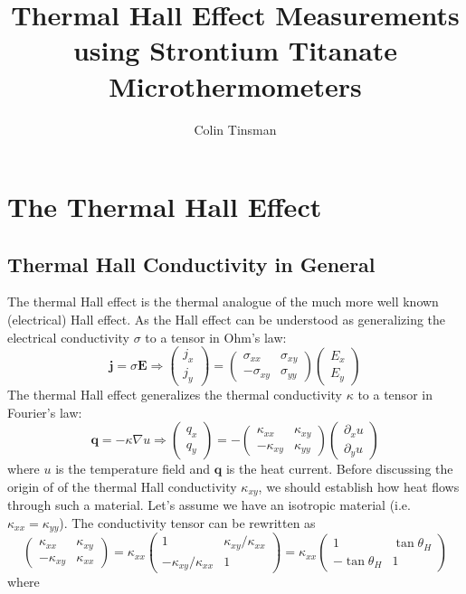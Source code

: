 \documentclass{thesis-umich}
\author{Colin Tinsman}
\title{Thermal Hall Effect Measurements using Strontium Titanate Microthermometers}
\begin{document}
\doublespacing
\chapter{The Thermal Hall Effect}


\section{Thermal Hall Conductivity in General}

The thermal Hall effect is the thermal analogue of the much more well known
(electrical) Hall effect. As the Hall effect can be understood as generalizing
the electrical conductivity \(\sigma\) to a tensor in Ohm's law: \[\mathbf{j} =
	\sigma \mathbf{E} \Rightarrow \begin{pmatrix} j_x \\ j_y \end{pmatrix}
= \begin{pmatrix} \sigma_{xx} & \sigma_{xy} \\ -\sigma_{xy} & \sigma_{yy}
\end{pmatrix} \begin{pmatrix} E_x \\ E_y \end{pmatrix} \] The thermal Hall
effect generalizes the thermal conductivity \(\kappa\) to a tensor in Fourier's
law: \[\mathbf{q} = -\kappa \nabla u \Rightarrow \begin{pmatrix} q_x \\ q_y
	\end{pmatrix} = -\begin{pmatrix} \kappa_{xx} & \kappa_{xy} \\
		-\kappa_{xy} & \kappa_{yy} \end{pmatrix} \begin{pmatrix}
		\partial_x u \\ \partial_y u \end{pmatrix} \] where \(u\) is
	the temperature field and \(\mathbf{q}\) is the heat current. Before
	discussing the origin of of the thermal Hall conductivity
	\(\kappa_{xy}\), we should establish how heat flows through such a
	material. Let's assume we have an isotropic material (i.e.
	\(\kappa_{xx} = \kappa_{yy}\)). The conductivity tensor can be
	rewritten as \[\begin{pmatrix} \kappa_{xx} & \kappa_{xy} \\
			-\kappa_{xy} & \kappa_{xx} \end{pmatrix} = \kappa_{xx}
		\begin{pmatrix} 1 & \kappa_{xy}/\kappa_{xx} \\
		-\kappa_{xy}/\kappa_{xx} & 1 \end{pmatrix} = \kappa_{xx}
\begin{pmatrix} 1 & \tan \theta_H \\ -\tan \theta_H & 1 \end{pmatrix} \] where
\end{document}
